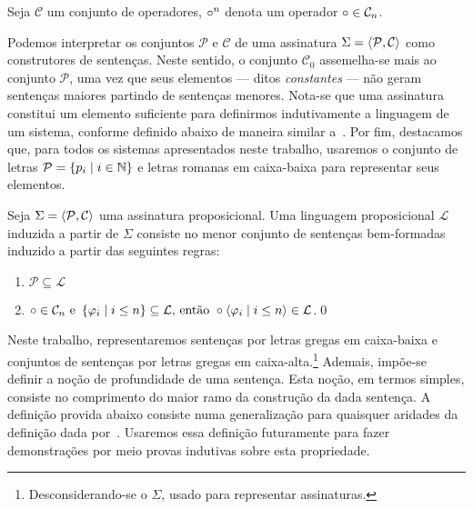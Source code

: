 \begin{tcolorbox}[enhanced jigsaw, breakable, sharp corners, colframe=black, colback=white, boxrule=0.5pt, left=1.5mm, right=1.5mm, top=1.5mm, bottom=1.5mm]
\begin{notation}
    Seja $\mathcal{C}$ um conjunto de operadores, $\mathalpha{\circ}^n$ denota um operador $\mathalpha{\circ}\in\mathcal{C}_n$.
\end{notation}
\end{tcolorbox}

Podemos interpretar os conjuntos $\mathcal{P}$ e $\mathcal{C}$ de uma assinatura $\Sigma=\langle\mathcal{P},\mathcal{C}\rangle$ como construtores de sentenças.
Neste sentido, o conjunto $\mathcal{C}_0$ assemelha-se mais ao conjunto $\mathcal{P}$, uma vez que seus elementos --- ditos \emph{constantes} --- não geram sentenças maiores partindo de sentenças menores.
Nota-se que uma assinatura constitui um elemento suficiente para definirmos indutivamente a linguagem de um sistema, conforme definido abaixo de maneira similar a~\cite{Franks}.
Por fim, destacamos que, para todos os sistemas apresentados neste trabalho, usaremos o conjunto de letras $\mathcal{P}=\left\{p_i\mid i\in\mathbb{N}\right\}$ e letras romanas em caixa-baixa para representar seus elementos.

\begin{tcolorbox}[enhanced jigsaw, breakable, sharp corners, colframe=black, colback=white, boxrule=0.5pt, left=1.5mm, right=1.5mm, top=1.5mm, bottom=1.5mm]
\begin{definition}[Linguagem]
    Seja $\Sigma=\langle\mathcal{P},\mathcal{C}\rangle$ uma assinatura proposicional. Uma linguagem proposicional $\mathcal{L}$ induzida a partir de $\Sigma$ consiste no menor conjunto de sentenças bem-formadas induzido a partir das seguintes regras:
    \begin{enumerate}[label=\textbf{\emph{(\alph*)}}, left=\parindent]
        \item$\mathcal{P}\subseteq\mathcal{L}$
        \item{}$\mathalpha{\circ}\in\mathcal{C}_n\text{ e }\set{\varphi_i\mid i\leq n}\subseteq\mathcal{L}\text{, então }\circ\sequence{\varphi_i\mid i\leq n}\in\mathcal{L}$.\qed{}
    \end{enumerate}
\end{definition}
\end{tcolorbox}

Neste trabalho, representaremos sentenças por letras gregas em caixa-baixa e conjuntos de sentenças por letras gregas em caixa-alta.\footnote{Desconsiderando-se o $\Sigma$, usado para representar assinaturas.}
Ademais, impõe-se definir a noção de profundidade de uma sentença. Esta noção, em termos simples, consiste no comprimento do maior ramo da construção da dada sentença. A definição provida abaixo consiste numa generalização para quaisquer aridades da definição dada por~\cite{Troelstra}. Usaremos essa definição futuramente para fazer demonstrações por meio provas indutivas sobre esta propriedade.

